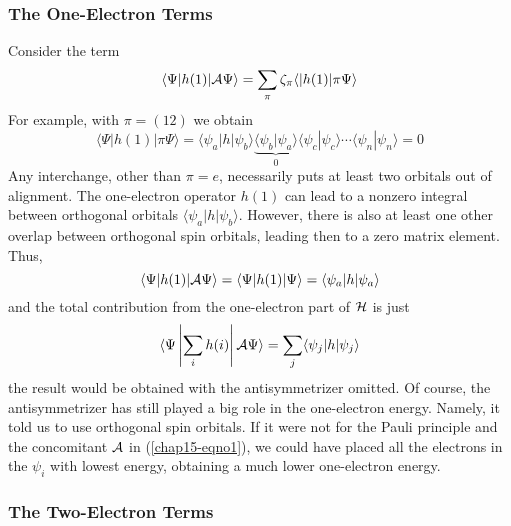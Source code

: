 \subsubsection{The One-Electron Terms}

Consider the term
\begin{equation}
\langle \Psi | h ( 1 ) | {\cal A} \Psi \rangle = \sum_{\pi} 
\zeta_{\pi} \langle | h ( 1 ) | \pi \Psi \rangle
\end{equation}
For example, with $\pi = (12)$ we obtain
\begin{equation}
\langle \Psi | h ( 1 ) | \pi \Psi \rangle = \langle \psi_a | h | 
\psi_b \rangle \underbrace{\langle \psi_b | \psi_a \rangle}_{0} 
\langle \psi_c | \psi_c \rangle \cdots \langle \psi_n | \psi_n 
\rangle = 0
\end{equation}
Any interchange, other than $\pi = e$, necessarily puts at least two orbitals 
out of alignment.  The one-electron operator $h(1)$ can lead to a nonzero 
integral between orthogonal orbitals $\langle \psi_a | h | \psi_b \rangle$.
However, there is also at least one other overlap between orthogonal spin
orbitals, leading then to a zero matrix element.  Thus,
\begin{equation}
\langle \Psi | h ( 1 ) | {\cal A} \Psi \rangle = \langle \Psi | h ( 
1 ) | \Psi \rangle = \langle \psi_a | h | \psi_a \rangle
\end{equation}
and the total contribution from the one-electron part of ${\cal H}$ is just
\begin{equation}
\langle \Psi \left| \sum_{i} h (i) \right| {\cal A} \Psi \rangle = \sum_{j} 
\langle \psi_j | h | \psi_j \rangle
\label{chap15-eqno6}
\end{equation}
the result would be obtained with the antisymmetrizer omitted.  Of
course, the antisymmetrizer has still played a big role in the
one-electron energy.  Namely, it told us to use orthogonal spin
orbitals.  If it were not for the Pauli principle and the concomitant
${\cal A}$ in (\ref{chap15-eqno1}), we could have placed all the
electrons in the $\psi_i$ with lowest energy, obtaining a much lower
one-electron energy.

\subsubsection{The Two-Electron Terms}

